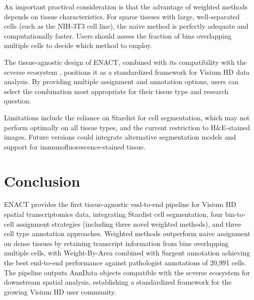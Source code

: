 \documentclass[11pt]{article}
\begin{document}
An important practical consideration is that the advantage of weighted methods depends on tissue characteristics. For sparse tissues with large, well-separated cells (such as the NIH-3T3 cell line), the naive method is perfectly adequate and computationally faster. Users should assess the fraction of bins overlapping multiple cells to decide which method to employ.

The tissue-agnostic design of ENACT, combined with its compatibility with the scverse ecosystem \citep{virshup2024anndata}, positions it as a standardized framework for Visium HD data analysis. By providing multiple assignment and annotation options, users can select the combination most appropriate for their tissue type and research question.

Limitations include the reliance on Stardist for cell segmentation, which may not perform optimally on all tissue types, and the current restriction to H\&E-stained images. Future versions could integrate alternative segmentation models and support for immunofluorescence-stained tissue.

\section{Conclusion}

ENACT provides the first tissue-agnostic end-to-end pipeline for Visium HD spatial transcriptomics data, integrating Stardist cell segmentation, four bin-to-cell assignment strategies (including three novel weighted methods), and three cell type annotation approaches. Weighted methods outperform naive assignment on dense tissues by retaining transcript information from bins overlapping multiple cells, with Weight-By-Area combined with Sargent annotation achieving the best end-to-end performance against pathologist annotations of 20,991 cells. The pipeline outputs AnnData objects compatible with the scverse ecosystem for downstream spatial analysis, establishing a standardized framework for the growing Visium HD user community.



\end{document}
